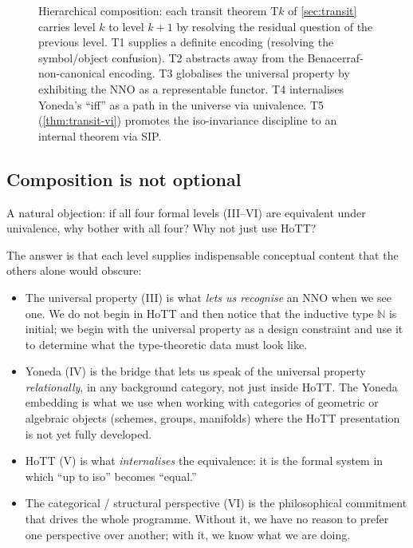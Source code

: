 \documentclass[12pt]{article}
\theoremstyle{definition}
\theoremstyle{remark}
\newcommand{\N}{\mathbb{N}}
\begin{document}
\begin{figure}[ht]
\centering
{}
\caption{Hierarchical composition: each transit theorem T$k$ of
\cref{sec:transit} carries level $k$ to level $k+1$ by resolving the
residual question of the previous level. T1 supplies a definite encoding
(resolving the symbol/object confusion). T2 abstracts away from the
Benacerraf-non-canonical encoding. T3 globalises the universal property
by exhibiting the NNO as a representable functor. T4 internalises
Yoneda's ``iff'' as a path in the universe via univalence. T5
(\cref{thm:transit-vi}) promotes the iso-invariance discipline to an
internal theorem via SIP.}
\label{fig:composition}
\end{figure}

\subsection{Composition is not optional}

A natural objection: if all four formal levels (III--VI) are equivalent
under univalence, why bother with all four? Why not just use HoTT?

The answer is that each level supplies indispensable conceptual content
that the others alone would obscure:
\begin{itemize}
\item The universal property (III) is what \emph{lets us recognise} an
NNO when we see one. We do not begin in HoTT and then notice that the
inductive type $\N$ is initial; we begin with the universal property as
a design constraint and use it to determine what the type-theoretic data
must look like.
\item Yoneda (IV) is the bridge that lets us speak of the universal
property \emph{relationally}, in any background category, not just inside
HoTT. The Yoneda embedding is what we use when working with categories
of geometric or algebraic objects (schemes, groups, manifolds) where the
HoTT presentation is not yet fully developed.
\item HoTT (V) is what \emph{internalises} the equivalence: it is the
formal system in which ``up to iso'' becomes ``equal.''
\item The categorical / structural perspective (VI) is the philosophical
commitment that drives the whole programme. Without it, we have no
reason to prefer one perspective over another; with it, we know what
we are doing.
\end{itemize}
\end{document}
